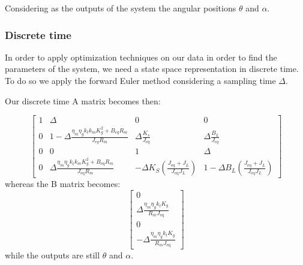                 Considering as the outputs of the system the angular positions $\theta$ and $\alpha$.

            \subsubsection{Discrete time}

                In order to apply optimization techniques on our data in order to find the parameters of the system, we need a state space representation in discrete time. To do so we apply the forward Euler method considering a sampling time $\Delta$.

                Our discrete time A matrix becomes then:

                \begin{equation}
                    \left\lbrack \begin{array}{cccc}
                        1 & \Delta  & 0 & 0\\
                        0 & 1-\Delta \frac{\eta_m \eta_g k_t k_m K_g^2 +B_{eq}R_m}{J_{eq}R_m} & \Delta \frac{K_s}{J_{eq}} & \Delta\frac{B_L}{J_{eq}}\\
                        0 & 0 & 1 & \Delta \\
                        0 & \Delta \frac{\eta_m \eta_g k_t k_m K_g^2 +B_{\mathrm{eq}} R_m }{J_{\mathrm{eq}} R_m } & -{\Delta K}_S \left(\frac{J_{\mathrm{eq}} +J_{L} }{J_{\mathrm{eq}} J_{L} }\right) & 1-{\Delta B}_L \left(\frac{J_{\mathrm{eq}} +J_{L} }{J_{\mathrm{eq}} J_{L} }\right)
                    \end{array}\right\rbrack 
                    \label{mat:discrete_system}
                \end{equation}
                whereas the B matrix becomes:       
                \begin{equation*}
                    \left\lbrack\begin{array}{c}
                        0\\
                        \Delta \frac{\eta_m \eta_g k_t K_g }{R_m J_{\mathrm{eq}} }\\
                        0\\
                        -\Delta \frac{\eta_m \eta_g k_t K_g }{R_m J_{\mathrm{eq}} }
                    \end{array}\right\rbrack
                \end{equation*}
                while the outputs are still $\theta$ and $\alpha$.

